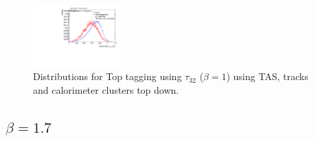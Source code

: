 \begin{figure}
\includegraphics[width=0.3\textwidth]{sascha_input/Appendix/Distributions/top/distributions/beta1/h_recoJet_nSub32_bin6.pdf}
\vspace{-0.75cm}
\caption{\footnotesize{Distributions for Top tagging using $\tau_{32}$ ($\beta=1$) using TAS, tracks and calorimeter clusters top down.}}
\end{figure}

\subsection*{$\beta=1.7$}
